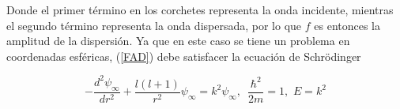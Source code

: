 Donde el primer término en los corchetes representa la onda incidente, mientras el segundo término representa la onda dispersada, por lo que $f$ es entonces la amplitud de la dispersión. Ya que en este caso se tiene un problema en coordenadas esféricas, (\ref{FAD}) debe satisfacer la ecuación de Schrödinger 

\begin{equation}
-\frac{d^2\psi_{\infty}}{dr^2} + \frac{l(l+1)}{r^2}\psi_{\infty} = k^2 \psi_{\infty} , \,\,\, \frac{\hbar^2}{2m}=1, \,\, E=k^2
\end{equation}


